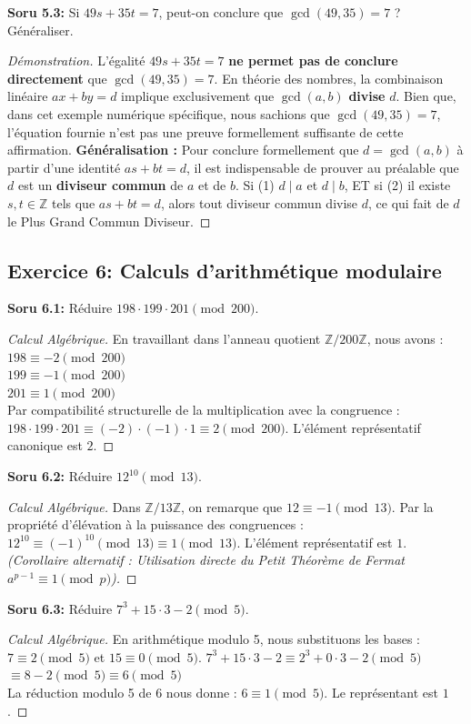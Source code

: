 \documentclass[12pt,a4paper]{report}
\begin{document}
\textbf{Soru 5.3:} Si $49s + 35t = 7$, peut-on conclure que $\gcd(49, 35) = 7$ ? Généraliser.
\begin{proof}[Démonstration]
L'égalité $49s + 35t = 7$ \textbf{ne permet pas de conclure directement} que $\gcd(49, 35) = 7$. 
En théorie des nombres, la combinaison linéaire $ax + by = d$ implique exclusivement que $\gcd(a, b)$ \textbf{divise} $d$.
Bien que, dans cet exemple numérique spécifique, nous sachions que $\gcd(49, 35) = 7$, l'équation fournie n'est pas une preuve formellement suffisante de cette affirmation.
\textbf{Généralisation :} Pour conclure formellement que $d = \gcd(a, b)$ à partir d'une identité $as + bt = d$, il est indispensable de prouver au préalable que $d$ est un \textbf{diviseur commun} de $a$ et de $b$. 
Si (1) $d \mid a$ et $d \mid b$, ET si (2) il existe $s, t \in \mathbb{Z}$ tels que $as + bt = d$, alors tout diviseur commun divise $d$, ce qui fait de $d$ le Plus Grand Commun Diviseur.
\end{proof}

\subsection*{Exercice 6: Calculs d'arithmétique modulaire}
\textbf{Soru 6.1:} Réduire $198 \cdot 199 \cdot 201 \pmod{200}$.
\begin{proof}[Calcul Algébrique]
En travaillant dans l'anneau quotient $\mathbb{Z}/200\mathbb{Z}$, nous avons :
$198 \equiv -2 \pmod{200}$ \\
$199 \equiv -1 \pmod{200}$ \\
$201 \equiv 1 \pmod{200}$ \\
Par compatibilité structurelle de la multiplication avec la congruence :
$198 \cdot 199 \cdot 201 \equiv (-2) \cdot (-1) \cdot 1 \equiv 2 \pmod{200}$.
L'élément représentatif canonique est $2$.
\end{proof}

\textbf{Soru 6.2:} Réduire $12^{10} \pmod{13}$.
\begin{proof}[Calcul Algébrique]
Dans $\mathbb{Z}/13\mathbb{Z}$, on remarque que $12 \equiv -1 \pmod{13}$.
Par la propriété d'élévation à la puissance des congruences :
$12^{10} \equiv (-1)^{10} \pmod{13} \equiv 1 \pmod{13}$.
L'élément représentatif est $1$.
\textit{(Corollaire alternatif : Utilisation directe du Petit Théorème de Fermat $a^{p-1} \equiv 1 \pmod p$).}
\end{proof}

\textbf{Soru 6.3:} Réduire $7^3 + 15 \cdot 3 - 2 \pmod{5}$.
\begin{proof}[Calcul Algébrique]
En arithmétique modulo 5, nous substituons les bases : $7 \equiv 2 \pmod{5}$ et $15 \equiv 0 \pmod{5}$.
$7^3 + 15 \cdot 3 - 2 \equiv 2^3 + 0 \cdot 3 - 2 \pmod{5}$ \\
$\equiv 8 - 2 \pmod{5} \equiv 6 \pmod{5}$ \\
La réduction modulo 5 de 6 nous donne : $6 \equiv 1 \pmod{5}$. 
Le représentant est $1$.
\end{proof}
\end{document}
